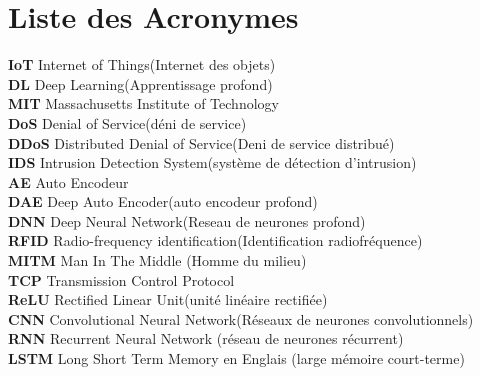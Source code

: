 \chapter*{Liste des Acronymes }
\textbf{IoT}\hspace{0.5cm}  Internet of Things(Internet des objets)\\
\textbf{DL} \hspace{0.5cm} Deep Learning(Apprentissage profond)\\
\textbf{MIT} \hspace{0.5cm} Massachusetts Institute of Technology \\
\textbf{DoS}\hspace{0.5cm} Denial of Service(déni de service)\\
\textbf{DDoS}\hspace{0.5cm}  Distributed Denial of Service(Deni de service distribué)\\
\textbf{IDS} \hspace{0.5cm} Intrusion Detection System(système de détection d'intrusion)\\
\textbf{AE}\hspace{0.5cm}  Auto Encodeur\\
\textbf{DAE}\hspace{0.5cm}  Deep Auto Encoder(auto encodeur profond)\\
\textbf{DNN} \hspace{0.5cm} Deep Neural Network(Reseau de neurones profond)\\
\textbf{RFID}\hspace{0.5cm}  Radio-frequency identification(Identification radiofréquence)\\
\textbf{MITM}\hspace{0.5cm} Man In The Middle (Homme du milieu)\\
\textbf{TCP} \hspace{0.5cm}Transmission Control Protocol \\
\textbf{ReLU}\hspace{0.5cm} Rectified Linear Unit(unité linéaire rectifiée)\\
\textbf{CNN} \hspace{0.5cm}Convolutional Neural Network(Réseaux de neurones convolutionnels)\\
 \textbf{RNN}\hspace{0.5cm} Recurrent Neural Network (réseau de neurones récurrent)\\
 \textbf{LSTM}\hspace{0.5cm}  Long Short Term Memory en Englais (large mémoire court-terme)\\
